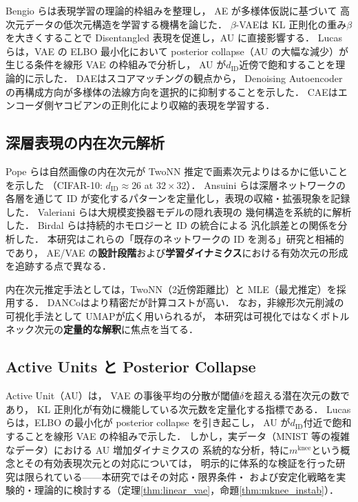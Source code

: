 \documentclass[11pt,a4paper]{jsarticle}
\newcommand{\mknee}{m^{\mathrm{knee}}}
\begin{document}
Bengio ら\cite{bengio2013representation}は表現学習の理論的枠組みを整理し，
AE が多様体仮説\cite{fefferman2016manifold}に基づいて
高次元データの低次元構造を学習する機構を論じた．
$\beta$-VAE\cite{higgins2017betavae}は KL 正則化の重み$\beta$を大きくすることで
Disentangled 表現を促進し，AU に直接影響する．
Lucas ら\cite{lucas2019elbo}は，VAE の ELBO 最小化において
posterior collapse（AU の大幅な減少）が生じる条件を線形 VAE の枠組みで分析し，
AU が$d_{\mathrm{ID}}$近傍で飽和することを理論的に示した．
DAE\cite{alain2014dae}はスコアマッチングの観点から，
Denoising Autoencoder の再構成方向が多様体の法線方向を選択的に抑制することを示した．
CAE\cite{rifai2011cae}はエンコーダ側ヤコビアンの正則化により収縮的表現を学習する．

\subsection{深層表現の内在次元解析}\label{sec:related_id}

Pope ら\cite{pope2021intrinsic}は自然画像の内在次元が
TwoNN 推定で画素次元よりはるかに低いことを示した
（CIFAR-10: $d_\mathrm{ID} \approx 26$ at $32 \times 32$）．
Ansuini ら\cite{ansuini2019intrinsic}は深層ネットワークの各層を通じて
ID が変化するパターンを定量化し，表現の収縮・拡張現象を記録した．
Valeriani ら\cite{valeriani2023geometry}は大規模変換器モデルの隠れ表現の
幾何構造を系統的に解析した．
Birdal ら\cite{birdal2021intrinsic}は持続的ホモロジーと ID の統合による
汎化誤差との関係を分析した．
本研究はこれらの「既存のネットワークの ID を測る」研究と相補的であり，
AE/VAE の\textbf{設計段階}および\textbf{学習ダイナミクス}における有効次元の形成を追跡する点で異なる．

内在次元推定手法としては，TwoNN\cite{facco2017twonn}（2近傍距離比）と
MLE\cite{levina2005mle}（最尤推定）を採用する．
DANCo\cite{ceruti2014danco}はより精密だが計算コストが高い．
なお，非線形次元削減の可視化手法として UMAP\cite{mcinnes2018umap}が広く用いられるが，
本研究は可視化ではなくボトルネック次元の\textbf{定量的な解釈}に焦点を当てる．

\subsection{Active Units と Posterior Collapse}\label{sec:related_au}

Active Unit（AU）\cite{lucas2019elbo,higgins2017betavae}は，
VAE の事後平均の分散が閾値$\delta$を超える潜在次元の数であり，
KL 正則化が有効に機能している次元数を定量化する指標である．
Lucas ら\cite{lucas2019elbo}は，ELBO の最小化が posterior collapse を引き起こし，
AU が$d_{\mathrm{ID}}$付近で飽和することを線形 VAE の枠組みで示した．
しかし，実データ（MNIST 等の複雑なデータ）における AU 増加ダイナミクスの
系統的な分析，特に$\mknee$という概念とその有効表現次元との対応については，
明示的に体系的な検証を行った研究は限られている——本研究ではその対応・限界条件・
および安定化戦略を実験的・理論的に検討する（定理\ref{thm:linear_vae}，命題\ref{thm:mknee_instab}）．
\end{document}
